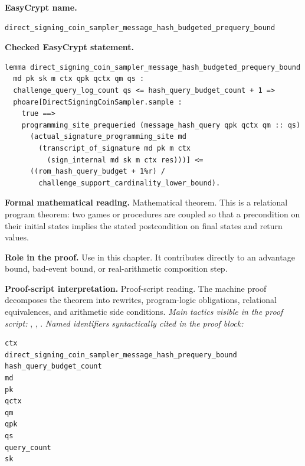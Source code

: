 \begin{formaltheorem}
\noindent\textbf{EasyCrypt name.}
\begin{lstlisting}[language=EasyCrypt,basicstyle=\ttfamily\scriptsize]
direct_signing_coin_sampler_message_hash_budgeted_prequery_bound
\end{lstlisting}
\noindent\textbf{Checked EasyCrypt statement.}
\begin{lstlisting}[language=EasyCrypt,basicstyle=\ttfamily\scriptsize]
lemma direct_signing_coin_sampler_message_hash_budgeted_prequery_bound
  md pk sk m ctx qpk qctx qm qs :
  challenge_query_log_count qs <= hash_query_budget_count + 1 =>
  phoare[DirectSigningCoinSampler.sample :
    true ==>
    programming_site_prequeried (message_hash_query qpk qctx qm :: qs)
      (actual_signature_programming_site md
        (transcript_of_signature md pk m ctx
          (sign_internal md sk m ctx res)))] <=
	  ((rom_hash_query_budget + 1%r) /
	    challenge_support_cardinality_lower_bound).
\end{lstlisting}
\noindent\textbf{Formal mathematical reading.}
Mathematical theorem. This is a relational program theorem: two games or procedures are coupled so that a precondition on their initial states implies the stated postcondition on final states and return values.

\noindent\textbf{Role in the proof.}
Use in this chapter. It contributes directly to an advantage bound, bad-event bound, or real-arithmetic composition step.

\noindent\textbf{Proof-script interpretation.}
Proof-script reading. The machine proof decomposes the theorem into rewrites, program-logic obligations, relational equivalences, and arithmetic side conditions.
\emph{Main tactics visible in the proof script:} , , .
\emph{Named identifiers syntactically cited in the proof block:}
\begin{lstlisting}[language=EasyCrypt,basicstyle=\ttfamily\scriptsize]
ctx
direct_signing_coin_sampler_message_hash_prequery_bound
hash_query_budget_count
md
pk
qctx
qm
qpk
qs
query_count
sk
\end{lstlisting}

\end{formaltheorem}

